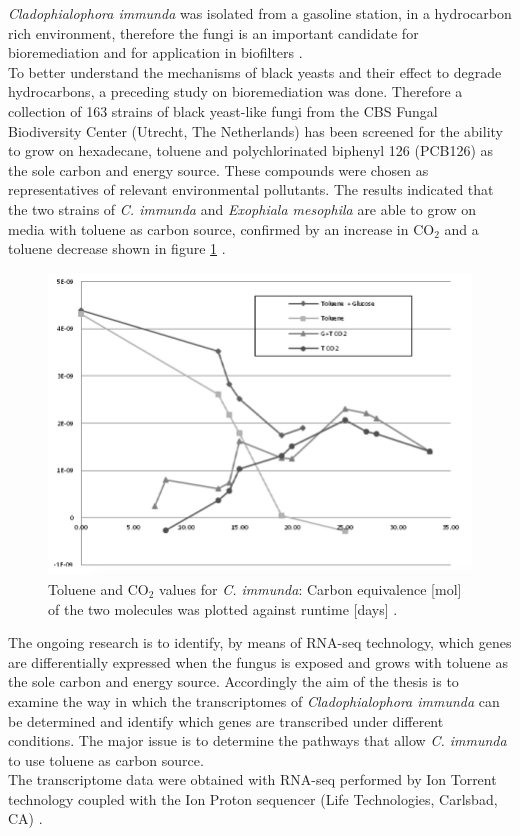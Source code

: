\documentclass[12pt, a4paper]{report}
\begin{document}
  
\textit{Cladophialophora immunda} was isolated from a gasoline station, in a hydrocarbon rich environment, therefore the fungi is an important candidate for bioremediation and for application in biofilters \cite{Prenafeta-Boldu2001}.  \\
To better understand the mechanisms of black yeasts and their effect to degrade hydrocarbons, a preceding study on bioremediation was done. Therefore a collection of 163 strains of black yeast-like fungi from the CBS Fungal Biodiversity Center (Utrecht, The Netherlands) has been screened for the ability to grow on hexadecane, toluene and polychlorinated biphenyl 126 (PCB126) as the sole carbon and energy source. These compounds were chosen as representatives of relevant environmental pollutants. 
The results indicated that the two strains of \textit{C. immunda} and \textit{Exophiala mesophila} are able to grow on media with toluene as carbon source, confirmed by an increase in CO$_2$ and a toluene decrease shown in figure \ref{GCresults} \cite{BarbaraBlasi2015, Poyntner2014}. 

\begin{figure}[H]
	\centering	
	\includegraphics[width=400pt]{pics/GCresults.png}
	\caption[Toluene and CO$_2$ values for \textit{C. immunda}]
	{Toluene and CO$_2$ values for \textit{C. immunda}: Carbon equivalence [mol] of the two molecules was plotted against runtime [days] \cite{Poyntner2014}. }
	\label{GCresults}
\end{figure}

The ongoing research is to identify, by means of RNA-seq technology, which genes are differentially expressed when the fungus is exposed and grows with toluene as the sole carbon and energy source.
Accordingly the aim of the thesis is to examine the way in which the transcriptomes of \textit{Cladophialophora immunda} can be determined and identify which genes are transcribed under different conditions. The major issue is to determine the pathways that allow \textit{C. immunda} to use toluene as carbon source.\\ 
The transcriptome data were obtained with RNA-seq performed by Ion Torrent technology coupled with the Ion Proton sequencer (Life Technologies, Carlsbad, CA) \cite{BarbaraBlasi2015}. 
\end{document}
